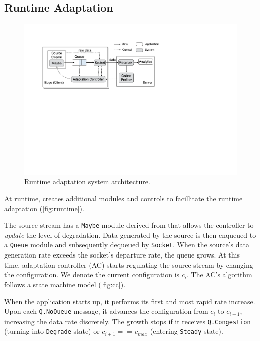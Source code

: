 \subsection{Runtime Adaptation}
\label{sec:runtime}

\begin{figure}
  \centering
  \includegraphics[width=\linewidth]{figures/runtime-adaptation.pdf}
  \caption{Runtime adaptation system architecture.}
  \label{fig:runtime}
\end{figure}

At runtime, \sysname{} creates additional modules and controls to facillitate
the runtime adaptation (\autoref{fig:runtime}).

The source stream has a \texttt{Maybe} module derived from \maybe{} that allows
the controller to \textit{update} the level of degradation. Data generated by
the source is then enqueued to a \texttt{Queue} module and subsequently dequeued
by \texttt{Socket}. When the source's data generation rate exceeds the socket's
departure rate, the queue grows. At this time, adaptation controller (AC) starts
regulating the source stream by changing the configuration. We denote the
current configuration is $c_i$. The AC's algorithm follows a state machine model
(\autoref{fig:cc}).

 When the application starts up, it performs its
first and most rapid rate increase. Upon each \texttt{Q.NoQueue} message, it
advances the configuration from $c_i$ to $c_{i+1}$, increasing the data rate
discretely. The growth stops if it receives \texttt{Q.Congestion} (turning into
\texttt{Degrade} state) or $c_{i+1} == c_{max}$ (entering \texttt{Steady}
state).

